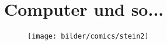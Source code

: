 \section{Computer und so...}

\newpage




\begin{figure}[h]
  \texttt{[image: bilder/comics/stein2]}
\end{figure}